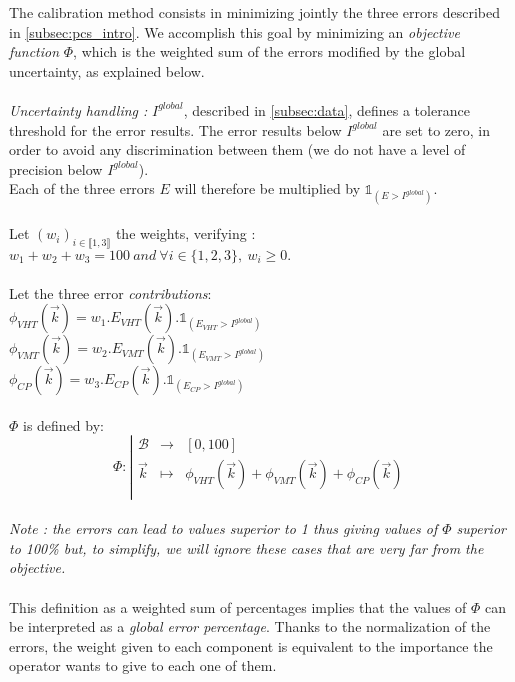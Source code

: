The calibration method consists in minimizing jointly the three errors described in \ref{subsec:pcs_intro}. We accomplish this goal by minimizing an \emph{objective function} $\Phi$, which is the weighted sum of the errors modified by the global uncertainty, as explained below.\\
\\
\emph{Uncertainty handling :} $I^{global}$, described in \ref{subsec:data}, defines a tolerance threshold for the error results. The error results below $I^{global}$ are set to zero, in order to avoid any discrimination between them (we do not have a level of precision below $I^{global}$).\\
Each of the three errors $E$ will therefore be multiplied by $\mathds{1}_{(E>I^{global})}.$\\ 
\\
Let $(w_{i})_{i\in\llbracket 1,3 \rrbracket}$ the weights, verifying :\\
$w_{1}+w_{2}+w_{3}=100\ and\ \forall i\in \{1,2,3\},\ w_{i}\geq 0.$\\
\\
Let the three error \emph{contributions}:\\
$\phi_{VHT}(\vec{k})=w_{1}.E_{VHT}(\vec{k}).\mathds{1}_{(E_{VHT}>I^{global})}$\\
$\phi_{VMT}(\vec{k})=w_{2}.E_{VMT}(\vec{k}).\mathds{1}_{(E_{VMT}>I^{global})}$\\
$\phi_{CP}(\vec{k})=w_{3}.E_{CP}(\vec{k}).\mathds{1}_{(E_{CP}>I^{global})}$\\
\\
$\Phi$ is defined by:\\
\begin{displaymath}
		\Phi:
		\left|
  		\begin{array}{rcl}
    	\mathscr{B} & \longrightarrow &[0,100] \\
    	\vec{k} & \longmapsto &  \phi_{VHT}(\vec{k})+\phi_{VMT}(\vec{k})+\phi_{CP}(\vec{k}) \\
  	\end{array}
	\right.
\end{displaymath}
\\
\emph{Note : the errors can lead to values superior to 1 thus giving values of $\Phi$ superior to 100\% but, to simplify, we will ignore these cases that are very far from the objective.}\\
\\

This definition as a weighted sum of percentages implies that the values of $\Phi$ can be interpreted as a \emph{global error percentage}. Thanks to the normalization of the errors, the weight given to each component is equivalent to the importance the operator wants to give to each one of them.

